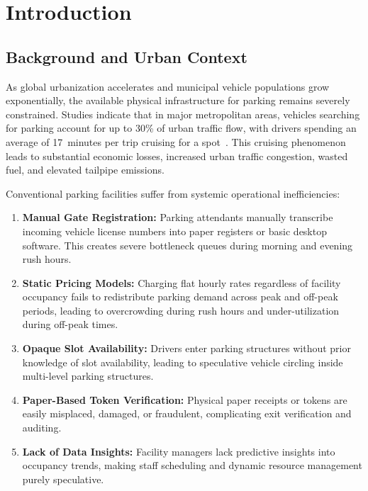 \documentclass[conference,10pt]{IEEEtran}
\begin{document}
\section{Introduction}

\subsection{Background and Urban Context}

As global urbanization accelerates and municipal vehicle populations grow exponentially, the available physical infrastructure for parking remains severely constrained. Studies indicate that in major metropolitan areas, vehicles searching for parking account for up to 30\% of urban traffic flow, with drivers spending an average of 17~minutes per trip cruising for a spot~\cite{shoup2006}. This cruising phenomenon leads to substantial economic losses, increased urban traffic congestion, wasted fuel, and elevated tailpipe emissions.

Conventional parking facilities suffer from systemic operational inefficiencies:

\begin{enumerate}[leftmargin=*]
    \item \textbf{Manual Gate Registration:} Parking attendants manually transcribe incoming vehicle license numbers into paper registers or basic desktop software. This creates severe bottleneck queues during morning and evening rush hours.
    \item \textbf{Static Pricing Models:} Charging flat hourly rates regardless of facility occupancy fails to redistribute parking demand across peak and off-peak periods, leading to overcrowding during rush hours and under-utilization during off-peak times.
    \item \textbf{Opaque Slot Availability:} Drivers enter parking structures without prior knowledge of slot availability, leading to speculative vehicle circling inside multi-level parking structures.
    \item \textbf{Paper-Based Token Verification:} Physical paper receipts or tokens are easily misplaced, damaged, or fraudulent, complicating exit verification and auditing.
    \item \textbf{Lack of Data Insights:} Facility managers lack predictive insights into occupancy trends, making staff scheduling and dynamic resource management purely speculative.
\end{enumerate}
\end{document}
